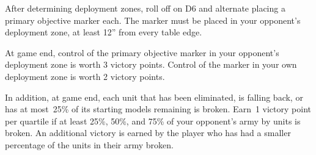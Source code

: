 

\begin{tablesetup}
  \hammerandanvil

  \bigskip%
  After determining deployment zones, roll off on D6 and alternate
  placing a primary objective marker each.  The marker must be placed
  in your opponent's deployment zone, at least 12'' from every table
  edge.
\end{tablesetup}

\begin{missionrules}

\nightfighting

\end{missionrules}


\begin{scoring}
  
\begin{primaries}
  At game end, control of the primary objective marker in your
  opponent's deployment zone is worth 3 victory points.  Control of
  the marker in your own deployment zone is worth 2 victory points.

  In addition, at game end, each unit that has been eliminated, is
  falling back, or has at most~25\% of its starting models remaining
  is broken.  Earn~1 victory point per quartile if at least 25\%,
  50\%, and 75\% of your opponent's army by units is broken.  An
  additional victory is earned by the player who has had a smaller
  percentage of the units in their army broken.
\end{primaries}

\begin{secondaries}
  \seizeground

  \reconnaissance

  \assassination

  \controlthefield
\end{secondaries}

\end{scoring}
